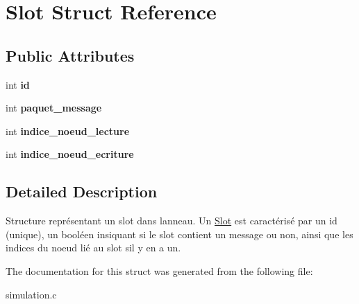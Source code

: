 \hypertarget{structSlot}{}\section{Slot Struct Reference}
\label{structSlot}
\subsection*{Public Attributes}
\begin{DoxyCompactItemize}
\item 
int {\bfseries id}\hypertarget{structSlot_a32589d4e878e8be8965841a259eef8d6}{}\label{structSlot_a32589d4e878e8be8965841a259eef8d6}

\item 
int {\bfseries paquet\+\_\+message}\hypertarget{structSlot_a9b0a0958973c0d3b51813fac41492831}{}\label{structSlot_a9b0a0958973c0d3b51813fac41492831}

\item 
int {\bfseries indice\+\_\+noeud\+\_\+lecture}\hypertarget{structSlot_a166682445d344df3379dd303c79bcf33}{}\label{structSlot_a166682445d344df3379dd303c79bcf33}

\item 
int {\bfseries indice\+\_\+noeud\+\_\+ecriture}\hypertarget{structSlot_a10bbba6b430cf07af2aba7051bf111fa}{}\label{structSlot_a10bbba6b430cf07af2aba7051bf111fa}

\end{DoxyCompactItemize}


\subsection{Detailed Description}
Structure représentant un slot dans l\textquotesingle{}anneau. Un \hyperlink{structSlot}{Slot} est caractérisé par un id (unique), un booléen insiquant si le slot contient un message ou non, ainsi que les indices du noeud lié au slot s\textquotesingle{}il y en a un. 

The documentation for this struct was generated from the following file\+:\begin{DoxyCompactItemize}
\item 
simulation.\+c\end{DoxyCompactItemize}
